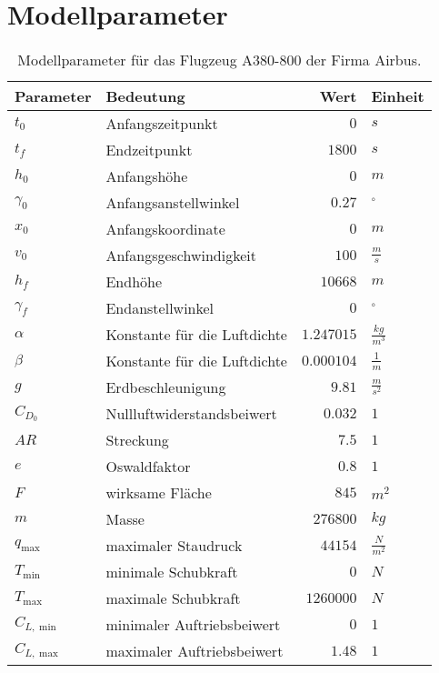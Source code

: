 \chapter{Modellparameter}\label{Anhang:ModellPara}

\begin{table}[H]
    \centering
    \caption{Modellparameter für das Flugzeug A380-800 der Firma Airbus.}\label{tab:ProblemPara}
    \begin{tabularx}{.9\textwidth}{lXrl}
        \toprule
        \textbf{Parameter}   & \textbf{Bedeutung} & \textbf{Wert} & \textbf{Einheit} \\ 
        \midrule
        $t_0$       & Anfangszeitpunkt & $0$ & $s$ \\ 
        $t_f$       & Endzeitpunkt & $1800$ & $s$ \\ 
        \hline
        $h_0$       & Anfangshöhe & $0$ & $m$ \\ 
        $\gamma_0$  & Anfangsanstellwinkel & $0.27$ & $^{\circ}$ \\
        $x_0$       & Anfangskoordinate & $0$ & $m$ \\ 
        $v_0$       & Anfangsgeschwindigkeit & $100$ & $\frac{m}{s}$ \\ 
        \hline
        $h_f$       & Endhöhe & $10668$ & $m$ \\ 
        $\gamma_f$  & Endanstellwinkel & $0$ & $^{\circ}$ \\
        \hline
        $\alpha$    & Konstante für die Luftdichte & $1.247015$ & $\frac{kg}{m^3}$\\ 
        $\beta$     & Konstante für die Luftdichte & $0.000104$ & $\frac{1}{m}$\\
        $g$         & Erdbeschleunigung & $9.81$ & $\frac{m}{s^2}$ \\ 
        $C_{D_0}$   & Nullluftwiderstandsbeiwert & $0.032$ & $1$\\ 
        $AR$        & Streckung & $7.5$ & $1$\\ 
        $e$         & Oswaldfaktor & $0.8$ & $1$\\ 
        $F$         & wirksame Fläche & $845$ & $m^2$ \\ 
        $m$         & Masse & $276800$ & $kg$ \\ 
        $q_{\max}$  & maximaler Staudruck & $44154$ & $\frac{N}{m^2}$ \\
        $T_{\min}$  & minimale Schubkraft & $0$ & $N$ \\  
        $T_{\max}$  & maximale Schubkraft & $1260000$ & $N$ \\ 
        $C_{L, \min}$ & minimaler Auftriebsbeiwert & $0$ & $1$ \\ 
        $C_{L, \max}$ & maximaler Auftriebsbeiwert & $1.48$ & $1$ \\ 
        \bottomrule
    \end{tabularx} 
\end{table}